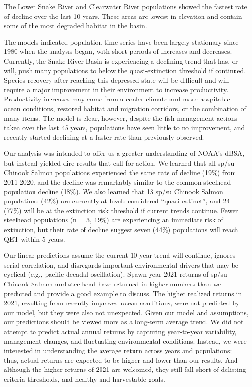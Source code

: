 \documentclass[10pt,a4paper]{article}
\begin{document}
The Lower Snake River and Clearwater River populations showed the fastest rate of decline over the last 10 years. These areas are lowest in elevation and contain some of the most degraded habitat in the basin.

The models indicated population time-series have been largely stationary since 1980 when the analysis began, with short periods of increases and decreases. Currently, the Snake River Basin is experiencing a declining trend that has, or will, push many populations to below the quasi-extinction threshold if continued. Species recovery after reaching this depressed state will be difficult and will require a major improvement in their environment to increase productivity. Productivity increases may come from a cooler climate and more hospitable ocean conditions, restored habitat and migration corridors, or the combination of many items. The model is clear, however, despite the fish management actions taken over the last 45 years, populations have seen little to no improvement, and recently started declining at a faster rate than previously observed.

Our analysis was intended to offer us a greater understanding of NOAA's dBSA, but instead yielded dire results that call for action. We learned that all sp/su Chinook Salmon populations experienced the same rate of decline (19\%) from 2011-2020, and the decline was remarkably similar to the common steelhead population decline (18\%). We also learned that 13 sp/su Chinook Salmon populations (42\%) are currently at levels considered ``quasi-extinct'', and 24 (77\%) will be at the extinction risk threshold if current trends continue. Fewer steelhead populations (n = 3, 19\%) are experiencing an immediate risk of extinction, but their rate of decline suggest seven (44\%) populations will reach QET within 5-years.

Our linear predictions assume the current 10-year trend will continue, ignores serial correlation, and disregards important environmental drivers that may be cyclical (e.g., pacific decadal oscillation). Spawn year 2021 returns of sp/su Chinook Salmon and steelhead have returned in higher numbers than we predicted and provide a good example to discuss. The higher realized returns in 2021, resulting from recently improved ocean conditions, were not predicted by our model, but they were also not unexpected. Given our model and assumptions, our predictions should be viewed more as a long-term average trend. We did not attempt to predict actual annual returns by capturing year-to-year variability, management changes, and fluctuating environmental conditions. Instead, we were interested in understanding the average return across years and populations; thus, actual returns are expected to be higher and lower than our results. And although the higher returns of 2021 are welcomed, they still fall short of delisting criteria thresholds, and healthy and harvestable goals.
\end{document}
